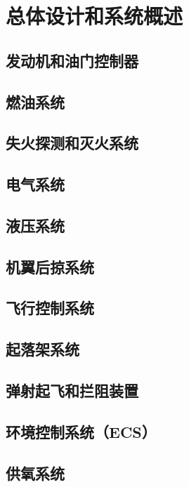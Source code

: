
\chapter{总体设计和系统概述}

\section{发动机和油门控制器}

\section{燃油系统}

\section{失火探测和灭火系统}

\section{电气系统}

\section{液压系统}

\section{机翼后掠系统}

\section{飞行控制系统}

\section{起落架系统}

\section{弹射起飞和拦阻装置}

\section{环境控制系统（ECS）}

\section{供氧系统}

